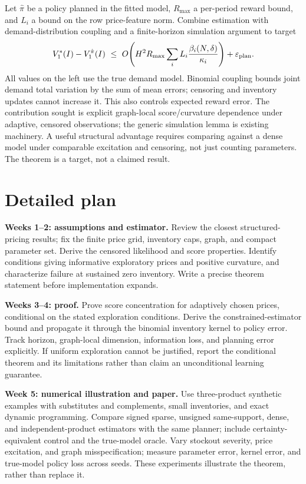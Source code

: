 \documentclass[10pt]{article}
\begin{document}
Let $\hat\pi$ be a policy planned in the fitted model, $R_{\max}$ a per-period reward bound, and $L_i$ a bound on the row price-feature norm. Combine estimation with demand-distribution coupling and a finite-horizon simulation argument to target
\begin{equation}
 V_1^*(I)-V_1^{\hat\pi}(I)
 \ \le\ O\!\left(H^2R_{\max}\sum_i
 L_i\frac{\beta_i(N,\delta)}{\kappa_i}\right)+\varepsilon_{\rm plan}.
\end{equation}
All values on the left use the true demand model. Binomial coupling bounds joint demand total variation by the sum of mean errors; censoring and inventory updates cannot increase it. This also controls expected reward error. The contribution sought is explicit graph-local score/curvature dependence under adaptive, censored observations; the generic simulation lemma is existing machinery. A useful structural advantage requires comparing against a dense model under comparable excitation and censoring, not just counting parameters. The theorem is a target, not a claimed result.

\section{Detailed plan}
\textbf{Weeks 1--2: assumptions and estimator.} Review the closest structured-pricing results; fix the finite price grid, inventory caps, graph, and compact parameter set. Derive the censored likelihood and score properties. Identify conditions giving informative exploratory prices and positive curvature, and characterize failure at sustained zero inventory. Write a precise theorem statement before implementation expands.

\textbf{Weeks 3--4: proof.} Prove score concentration for adaptively chosen prices, conditional on the stated exploration conditions. Derive the constrained-estimator bound and propagate it through the binomial inventory kernel to policy error. Track horizon, graph-local dimension, information loss, and planning error explicitly. If uniform exploration cannot be justified, report the conditional theorem and its limitations rather than claim an unconditional learning guarantee.

\textbf{Week 5: numerical illustration and paper.} Use three-product synthetic examples with substitutes and complements, small inventories, and exact dynamic programming. Compare signed sparse, unsigned same-support, dense, and independent-product estimators with the same planner; include certainty-equivalent control and the true-model oracle. Vary stockout severity, price excitation, and graph misspecification; measure parameter error, kernel error, and true-model policy loss across seeds. These experiments illustrate the theorem, rather than replace it.
\end{document}
